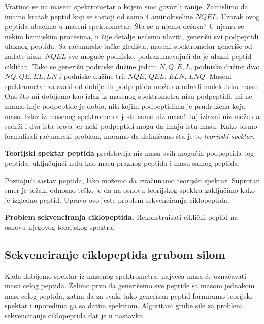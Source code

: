 Vratimo se na maseni spektrometar o kojem smo govorili ranije. Zamislimo da imamo kratak peptid koji se sastoji od samo 4 aminokiseline $NQEL$. Uzorak ovog peptida ubacimo u maseni spektrometar. Šta se u njemu dešava? U njemu se nekim hemijskim procesima, u čije detalje nećemo ulaziti, generišu svi podpeptidi ulaznog peptida. Sa računarske tačke gledišta, maseni spektrometar generiše od zadate niske $NQEL$ sve moguće podniske, podrazumevajući da je ulazni peptid cikličan. Tako se generišu podniske dužine jedan: $N, Q, E, L$, podniske dužine dva: $NQ, QE, EL, LN$ i podniske dužine tri: $NQE$, $QEL$, $ELN$, $LNQ$. Maseni spektrometar za svaki od dobijenih podpeptida može da odredi molekulsku masu. Ono što mi dobijemo kao izlaz iz masenog spektrometra nisu podpeptidi, mi ne znamo koje podpeptide je dobio, niti kojim podpeptidima je prudružena koja masa. Izlaz iz masenog spektrometra jeste samo niz masa! Taj izlazni niz može da sadrži i dva ista broja jer neki podpeptidi mogu da imaju istu masu. Kako bismo formulisali računarski problem, moramo da definišemo šta je to \textit{teorijski spektar}. 
\begin{definicija} \textbf{Teorijski spektar peptida} predstavlja niz masa svih mogućih podpeptida tog peptida, uključujući nulu kao masu praznog peptida i masu samog peptida.
\end{definicija}

Poznajući sastav peptida, lako možemo da izračunamo teorijski spektar. Suprotan smer je težak, odnosno teško je da na osnovu teorijskog spektra zaključimo kako je izgledao peptid. Upravo ovo jeste problem sekvenciranja ciklopeptida.

\begin{tcolorbox}\textbf{Problem sekvenciranja ciklopeptida.} 
	Rekonstruisati ciklični peptid na osnovu njegovog teorijskog spektra.
\end{tcolorbox}



\subsection{Sekvenciranje ciklopeptida grubom silom}

Kada dobijemo spektar iz masenog spektrometra, najveća masa će označavati masu celog peptida. Želimo prvo da generišemo sve peptide sa masom jednakom masi celog peptida, zatim da za svaki tako generisan peptid formiramo teorijski spektar i uporedimo ga sa datim spektrom. Algoritam grube sile za problem sekvenciranje ciklopeptida dat je u nastavku. 

